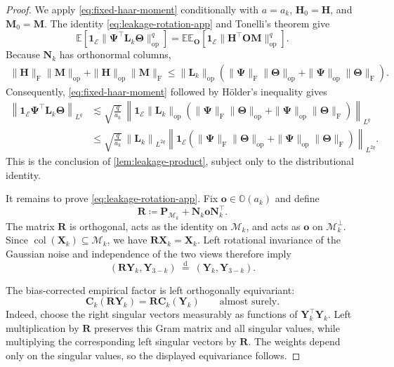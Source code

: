 \documentclass[11pt]{article}
\newcommand{\ind}{\bm{1}}
\newcommand{\trans}{\top}
\newcommand{\Lqn}[2]{\left\lVert #1\right\rVert_{L^{#2}}}
\newcommand{\cM}{\mathcal{M}}
\newcommand{\cE}{\mathcal{E}}
\begin{document}
\begin{proof}
We apply \cref{eq:fixed-haar-moment} conditionally with
\(a=a_k\), \(\bm H_0=\bm H\), and \(\bm M_0=\bm M\).
The identity \cref{eq:leakage-rotation-app} and Tonelli's theorem give
\[
  \mathbb E\left[
    \ind_{\cE}
    \|\bm\Psi^\trans\bm L_k\bm\Theta\|_{\mathrm{op}}^q
  \right]
  =
  \mathbb E\mathbb E_{\bm O}\left[
    \ind_{\cE}
    \|\bm H^\trans\bm O\bm M\|_{\mathrm{op}}^q
  \right].
\]
Because \(\bm N_k\) has orthonormal columns,
\[
\begin{aligned}
  \|\bm H\|_{\mathrm F}\|\bm M\|_{\mathrm{op}}
  +
  \|\bm H\|_{\mathrm{op}}\|\bm M\|_{\mathrm F}
  \le
  \|\bm L_k\|_{\mathrm{op}}
  \left(
    \|\bm\Psi\|_{\mathrm F}\|\bm\Theta\|_{\mathrm{op}}
    +
    \|\bm\Psi\|_{\mathrm{op}}\|\bm\Theta\|_{\mathrm F}
  \right).
\end{aligned}
\]
Consequently, \cref{eq:fixed-haar-moment} followed by Hölder's inequality
gives
\[
\begin{aligned}
  \Lqn{
    \ind_{\cE}\bm\Psi^\trans\bm L_k\bm\Theta
  }{q}
  &\lesssim
  \sqrt{\frac q{a_k}}\,
  \left\|
    \ind_{\cE}\|\bm L_k\|_{\mathrm{op}}
    \left(
      \|\bm\Psi\|_{\mathrm F}\|\bm\Theta\|_{\mathrm{op}}
      +
      \|\bm\Psi\|_{\mathrm{op}}\|\bm\Theta\|_{\mathrm F}
    \right)
  \right\|_{L^q} \\
  &\le
  \sqrt{\frac q{a_k}}\,
  \Lqn{\bm L_k}{2q}
  \Lqn{
    \ind_{\cE}
    \left(
      \|\bm\Psi\|_{\mathrm F}\|\bm\Theta\|_{\mathrm{op}}
      +
      \|\bm\Psi\|_{\mathrm{op}}\|\bm\Theta\|_{\mathrm F}
    \right)
  }{2q}.
\end{aligned}
\]
This is the conclusion of \cref{lem:leakage-product}, subject only to the
distributional identity.

It remains to prove \cref{eq:leakage-rotation-app}. Fix
\(\bm o\in\mathbb O(a_k)\) and define
\[
  \bm R
  \coloneqq
  \bm P_{\cM_k}
  +
  \bm N_k\bm o\bm N_k^\trans.
\]
The matrix \(\bm R\) is orthogonal, acts as the identity on \(\cM_k\), and
acts as \(\bm o\) on \(\cM_k^\perp\). Since
\(\operatorname{col}(\bm X_k)\subseteq\cM_k\), we have
\(\bm R\bm X_k=\bm X_k\). Left rotational invariance of the Gaussian noise
and independence of the two views therefore imply
\[
  (\bm R\bm Y_k,\bm Y_{3-k})
  \ \overset{\mathrm d}{=}\
  (\bm Y_k,\bm Y_{3-k}).
\]

The bias-corrected empirical factor is left orthogonally equivariant:
\[
  \bm C_k(\bm R\bm Y_k)
  =
  \bm R\bm C_k(\bm Y_k)
  \qquad\text{almost surely}.
\]
Indeed, choose the right singular vectors measurably as functions of
\(\bm Y_k^\trans\bm Y_k\). Left multiplication by \(\bm R\) preserves this
Gram matrix and all singular values, while multiplying the corresponding
left singular vectors by \(\bm R\). The weights depend only on the singular
values, so the displayed equivariance follows.


\end{proof}
\end{document}
